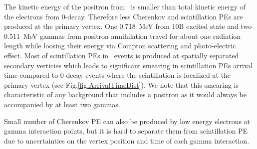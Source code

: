 The kinetic energy of the positron from \C~is smaller than total kinetic energy of the electrons from 0\nbb-decay. Therefore less 
Cherenkov and scintillation PEs are produced at the primary vertex. One 0.718~MeV from $10$B excited state and two 0.511~MeV gammas
from positron annihilation travel for about one radiation length while loosing their energy via Compton scattering and photo-electric effect.
Most of scintillation PEs in \C~events is produced at spatially separated secondary verticies which leads to significant smearing in scintillation 
PEs arrival time compared to 0\nbb-decay events where the scintillation is localized at the primary vertex (see Fig.\ref{fig:ArrivalTimeDist}). 
We note that this smearing is characteristic of any background that includes a positron as it would always be accompanied by at least 
two gammas.

Small number of Cherenkov PE can also be produced by low energy electrons at gamma interaction points, but it is hard to separate them
from scintillation PE due to uncertainties on the vertex position and time of each gamma interaction.




